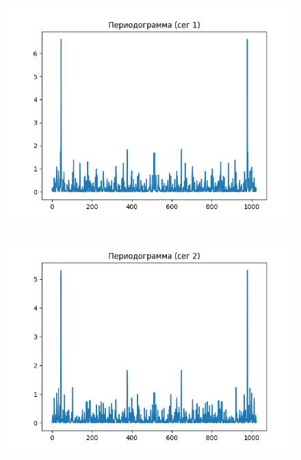 \documentclass[12pt]{article}
\begin{document}
\begin{figure}[!htb]
\centering
\includegraphics[scale=1.00]{period_1.png}
\caption{}
\label{}
\end{figure}

\begin{figure}[!htb]
\centering
\includegraphics[scale=1.00]{period_2.png}
\caption{}
\label{}
\end{figure}
\end{document}
